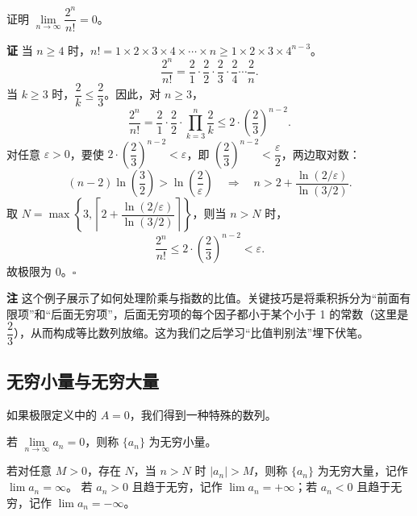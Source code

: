 \documentclass[fontset=fandol]{ctexart}
\newenvironment{custom}[1]{\par\noindent\textbf{#1}\quad}{\par\vspace{0.8em}}
\begin{document}
\begin{example}
证明 \(\lim\limits_{n\to\infty} \dfrac{2^n}{n!} = 0\)。
\end{example}
\begin{custom}{证}
当 \(n \geq 4\) 时，\(n! = 1 \times 2 \times 3 \times 4 \times \cdots \times n \geq 1 \times 2 \times 3 \times 4^{n-3}\)。
\[
\dfrac{2^n}{n!} = \dfrac{2}{1} \cdot \dfrac{2}{2} \cdot \dfrac{2}{3} \cdot \dfrac{2}{4} \cdots \dfrac{2}{n}.
\]
当 \(k \geq 3\) 时，\(\dfrac{2}{k} \leq \dfrac{2}{3}\)。因此，对 \(n \geq 3\)，
\[
\dfrac{2^n}{n!} = \dfrac{2}{1} \cdot \dfrac{2}{2} \cdot \prod_{k=3}^{n} \dfrac{2}{k} \leq 2 \cdot \left(\dfrac{2}{3}\right)^{n-2}.
\]
对任意 \(\varepsilon > 0\)，要使 \(2 \cdot \left(\dfrac{2}{3}\right)^{n-2} < \varepsilon\)，即 \(\left(\dfrac{2}{3}\right)^{n-2} < \dfrac{\varepsilon}{2}\)，两边取对数：
\[
(n-2) \ln\left(\dfrac{3}{2}\right) > \ln\left(\dfrac{2}{\varepsilon}\right) \quad\Longrightarrow\quad n > 2 + \dfrac{\ln(2/\varepsilon)}{\ln(3/2)}.
\]
取 \(N = \max\left\{3, \left\lceil 2 + \dfrac{\ln(2/\varepsilon)}{\ln(3/2)} \right\rceil\right\}\)，则当 \(n > N\) 时，
\[
\dfrac{2^n}{n!} \leq 2 \cdot \left(\dfrac{2}{3}\right)^{n-2} < \varepsilon.
\]
故极限为 0。\(\square\)
\end{custom}

\begin{custom}{注}
这个例子展示了如何处理阶乘与指数的比值。关键技巧是将乘积拆分为“前面有限项”和“后面无穷项”，后面无穷项的每个因子都小于某个小于 1 的常数（这里是 \(\dfrac{2}{3}\)），从而构成等比数列放缩。这为我们之后学习“比值判别法”埋下伏笔。
\end{custom}


\subsection{无穷小量与无穷大量}

如果极限定义中的 \(A = 0\)，我们得到一种特殊的数列。

\begin{definition}[无穷小量]
若 \(\lim\limits_{n\to\infty} a_n = 0\)，则称 \(\{a_n\}\) 为无穷小量。
\end{definition}

\begin{definition}[无穷大量]
若对任意 \(M > 0\)，存在 \(N\)，当 \(n > N\) 时 \(|a_n| > M\)，则称 \(\{a_n\}\) 为无穷大量，记作 \(\lim a_n = \infty\)。
若 \(a_n > 0\) 且趋于无穷，记作 \(\lim a_n = +\infty\)；若 \(a_n < 0\) 且趋于无穷，记作 \(\lim a_n = -\infty\)。
\end{definition}
\end{document}
